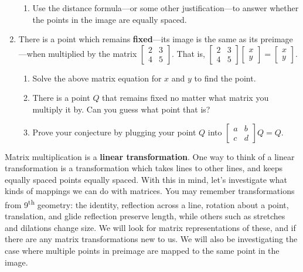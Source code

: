 \documentclass[../gatm.tex]{subfiles}
\begin{document}
\begin{enumerate}
\begin{enumerate}
\item Use the distance formula---or some other justification---to answer whether the points in the image are equally spaced.
\end{enumerate}
\item There is a point which remains \textbf{fixed}---its image is the same as its preimage---when multiplied by the matrix $\left[\begin{array}{cc}2 & 3 \\ 4 & 5 \end{array}\right]$. That is, $\left[\begin{array}{cc}2 & 3 \\ 4 & 5 \end{array}\right]\left[\begin{array}{c} x \\ y \end{array}\right]=\left[\begin{array}{c} x \\ y \end{array}\right]$.
\begin{enumerate}
\item Solve the above matrix equation for $x$ and $y$ to find the point.
\item There is a point $Q$ that remains fixed no matter what matrix you multiply it by. Can you guess what point that is?
\item Prove your conjecture by plugging your point $Q$ into $\left[\begin{array}{cc}a & b \\ c & d\end{array}\right]Q=Q$.
\end{enumerate}
\setcounter{mp_problem_i}{\value{enumi}}
\end{enumerate}

\noindent Matrix multiplication is a \textbf{linear transformation}. One way to think of a linear transformation is a transformation which takes lines to other lines, and keeps equally spaced points equally spaced. With this in mind, let's investigate what kinds of mappings we can do with matrices. You may remember transformations from 9\textsuperscript{th} geometry: the identity, reflection across a line, rotation about a point, translation, and glide reflection preserve length, while others such as stretches and dilations change size. We will look for matrix representations of these, and if there are any matrix transformations new to us. We will also be investigating the case where multiple points in preimage are mapped to the same point in the image.
\end{document}
